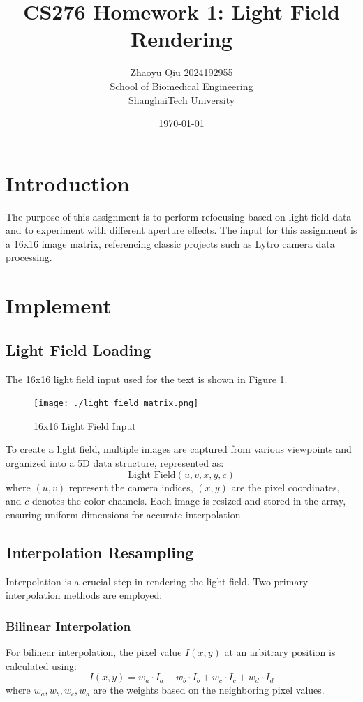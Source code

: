 \documentclass{article}
\begin{document}
\title{CS276 Homework 1: Light Field Rendering}
\author{Zhaoyu Qiu 2024192955\\ School of Biomedical Engineering \\ ShanghaiTech University }
\date{\today}
\maketitle

\section{Introduction}
\indent The purpose of this assignment is to perform refocusing based on light field data and to experiment with different aperture effects. The input for this assignment is a 16x16 image matrix, referencing classic projects such as Lytro camera data processing.

\section{Implement}

\subsection{Light Field Loading}
The 16x16 light field input used for the text is shown in Figure \ref{fig:light_field}.

\begin{figure}[ht]
    \centering
    \texttt{[image: ./light\_field\_matrix.png]}  %
    \caption{16x16 Light Field Input}
    \label{fig:light_field}
\end{figure}

To create a light field, multiple images are captured from various viewpoints and organized into a 5D data structure, represented as:
\[
\text{Light Field}(u, v, x, y, c)
\]
where \( (u, v) \) represent the camera indices, \( (x, y) \) are the pixel coordinates, and \( c \) denotes the color channels. Each image is resized and stored in the array, ensuring uniform dimensions for accurate interpolation.

\subsection{Interpolation Resampling}
Interpolation is a crucial step in rendering the light field. Two primary interpolation methods are employed:

\subsubsection{Bilinear Interpolation}
For bilinear interpolation, the pixel value \( I(x, y) \) at an arbitrary position is calculated using:
\[
I(x, y) = w_a \cdot I_a + w_b \cdot I_b + w_c \cdot I_c + w_d \cdot I_d
\]
where \( w_a, w_b, w_c, w_d \) are the weights based on the neighboring pixel values.
\end{document}
